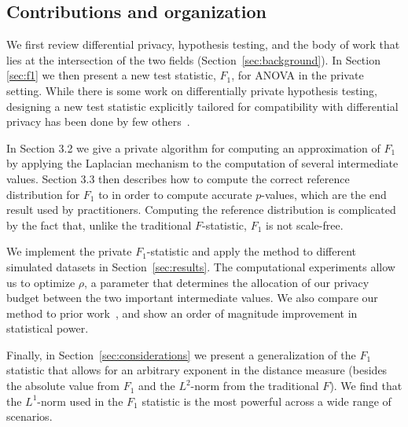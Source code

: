 \documentclass[USenglish,oneside]{article}
\newcounter{ag}
\newcounter{ab}
\newcounter{ar}
\begin{document}
\subsection{Contributions and organization}

We first review differential privacy, hypothesis testing, and the body of work that lies at the intersection of the two fields (Section~\ref{sec:background}).  
In Section \ref{sec:f1} we then present a new test statistic, $F_1$, for ANOVA in the private setting.  While there is some work on differentially private hypothesis testing, designing a new test statistic explicitly tailored for compatibility with differential privacy has been done by few others~\cite{rogers2017new}.  

In Section 3.2 we give a private algorithm for computing an approximation of $F_1$ by applying the Laplacian mechanism to the computation of several intermediate values.  Section 3.3 then describes how to compute the correct reference distribution for $F_1$ to in order to compute accurate $p$-values, which are the end result used by practitioners.  Computing the reference distribution is complicated by the fact that, unlike the traditional $F$-statistic, $F_1$ is not scale-free. 

We implement the private $F_1$-statistic and apply the method to different simulated datasets in Section~\ref{sec:results}.  The computational experiments allow us to optimize $\rho$, a parameter that determines the allocation of our privacy budget between the two important intermediate values.  We also compare our method to prior work~\cite{campbell2018diffprivanova}, and show an order of magnitude improvement in statistical power.


Finally, in Section~\ref{sec:considerations} we present a generalization of the $F_1$ statistic that allows for an arbitrary exponent in the distance measure (besides the absolute value from $F_1$ and the $L^2$-norm from the traditional $F$). We find that the $L^1$-norm used in the $F_1$ statistic is the most powerful across a wide range of scenarios.
\end{document}

